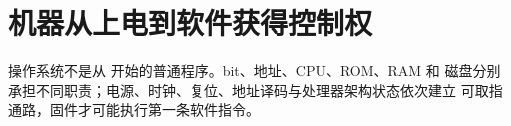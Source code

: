 \chapter{机器从上电到软件获得控制权}

\begin{keyidea}
操作系统不是从  开始的普通程序。bit、地址、CPU、ROM、RAM 和
磁盘分别承担不同职责；电源、时钟、复位、地址译码与处理器架构状态依次建立
可取指通路，固件才可能执行第一条软件指令。
\end{keyidea}







